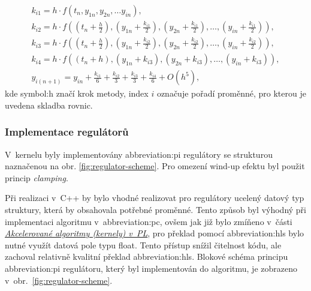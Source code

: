 \documentclass[a4paper, twoside, 11pt]{article}
\begin{document}
		\begin{equation}\label{eq:rk4-algoritmus-math-eq-in-kernel}
			\begin{gathered}
				k_{i 1} = h \cdot f(t_{n}, y_{1{n}}, y_{2{n}},\dots y_{{in}}),\\
				k_{i 2} = h \cdot f((t_{n}+\frac{h}{2}), (y_{1{n}} + \frac{k_{i 1}}{2}),(y_{2{n}}+ \frac{k_{i 1}}{2}),\dots , (y_{{in}}+\frac{k_{i 1}}{2})),\\
				k_{i 3} = h \cdot f((t_{n}+\frac{h}{2}), (y_{1{n}} + \frac{k_{i 2}}{2}), (y_{2{n}}+ \frac{k_{i 2}}{2}),\dots , (y_{{in}}+\frac{k_{i 2}}{2})),\\
				k_{i 4} = h \cdot f((t_{n}+h), (y_{1{n}} + k_{i 3}), (y_{2{n}}+ k_{i 3}),\dots , (y_{{in}}+k_{i 3})),\\
				y_{i(n+1)} = y_{i n} + \frac{k_{i 1}}{6} + \frac{k_{i 2}}{3} + \frac{k_{i 3}}{3} + \frac{k_{i 4}}{6} + O(h^{5}),
			\end{gathered}
		\end{equation}
		kde \gls{symbol:h} značí krok metody, index $i$ označuje pořadí proměnné, pro kterou je uvedena skladba rovnic.\par

		\subsubsection{Implementace regulátorů}
			V~kernelu byly implementovány \gls{abbreviation:pi} regulátory se strukturou naznačenou na obr. \ref{fig:regulator-scheme}. Pro omezení wind-up efektu byl použit princip \textit{clamping}.\par
			Při realizaci v~C++ by bylo vhodné realizovat pro regulátory ucelený datový typ struktury, která by obsahovala potřebné proměnné. Tento způsob byl výhodný při implementaci algoritmu v~\gls{abbreviation:pc}, ovšem jak již bylo zmíňeno v~části \hyperref[subsec:akcelerovane-algoritmy-kernely-v-pl]{\textit{Akcelerované algoritmy (kernely) v~PL}}, pro překlad pomocí \gls{abbreviation:hls} bylo nutné využít datová pole typu float. Tento přístup snížil čitelnost kódu, ale zachoval relativně kvalitní překlad \gls{abbreviation:hls}. Blokové schéma principu \gls{abbreviation:pi} regulátoru, který byl implementován do algoritmu, je zobrazeno v~obr.~\ref{fig:regulator-scheme}.\par
			
\end{document}
